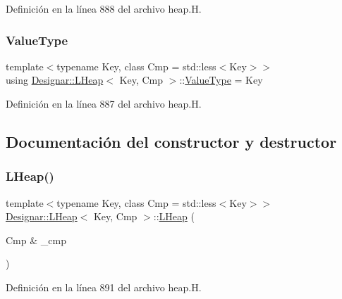 Definición en la línea 888 del archivo heap.\+H.

\mbox{\label{class_designar_1_1_l_heap_a7c24dbacc35909235f49057ffb3a8723}} 
\subsubsection{\texorpdfstring{Value\+Type}{ValueType}}
{\footnotesize\ttfamily template$<$typename Key, class Cmp = std\+::less$<$\+Key$>$$>$ \\
using \hyperlink{class_designar_1_1_l_heap}{Designar\+::\+L\+Heap}$<$ Key, Cmp $>$\+::\hyperlink{class_designar_1_1_l_heap_a7c24dbacc35909235f49057ffb3a8723}{Value\+Type} =  Key}



Definición en la línea 887 del archivo heap.\+H.



\subsection{Documentación del constructor y destructor}
\mbox{\label{class_designar_1_1_l_heap_ad645d2b25a8a0cbd4ccfcab02eee1740}} 
\subsubsection{\texorpdfstring{L\+Heap()}{LHeap()}\hspace{0.1cm}{\footnotesize\ttfamily [1/3]}}
{\footnotesize\ttfamily template$<$typename Key, class Cmp = std\+::less$<$\+Key$>$$>$ \\
\hyperlink{class_designar_1_1_l_heap}{Designar\+::\+L\+Heap}$<$ Key, Cmp $>$\+::\hyperlink{class_designar_1_1_l_heap}{L\+Heap} (\begin{DoxyParamCaption}\item[{Cmp \&}]{\+\_\+cmp }\end{DoxyParamCaption})\hspace{0.3cm}{\ttfamily [inline]}}



Definición en la línea 891 del archivo heap.\+H.

